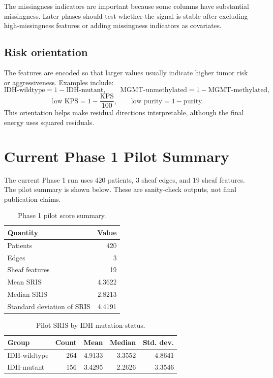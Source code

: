 \documentclass[11pt]{article}
\begin{document}
The missingness indicators are important because some columns have substantial missingness.  Later phases should test whether the signal is stable after excluding high-missingness features or adding missingness indicators as covariates.

\subsection{Risk orientation}

The features are encoded so that larger values usually indicate higher tumor risk or aggressiveness.  Examples include:
\[
\text{IDH-wildtype}=1-\text{IDH-mutant},
\qquad
\text{MGMT-unmethylated}=1-\text{MGMT-methylated},
\]
\[
\text{low KPS}=1-\frac{\text{KPS}}{100},
\qquad
\text{low purity}=1-\text{purity}.
\]
This orientation helps make residual directions interpretable, although the final energy uses squared residuals.

\section{Current Phase 1 Pilot Summary}

The current Phase 1 run uses $420$ patients, $3$ sheaf edges, and $19$ sheaf features.  The pilot summary is shown below.  These are sanity-check outputs, not final publication claims.

\begin{table}[h!]
\centering
\caption{Phase 1 pilot score summary.}
\begin{tabular}{@{}lr@{}}
\toprule
Quantity & Value\\
\midrule
Patients & 420\\
Edges & 3\\
Sheaf features & 19\\
Mean SRIS & 4.3622\\
Median SRIS & 2.8213\\
Standard deviation of SRIS & 4.4191\\
\bottomrule
\end{tabular}
\end{table}

\begin{table}[h!]
\centering
\caption{Pilot SRIS by IDH mutation status.}
\begin{tabular}{@{}lrrrr@{}}
\toprule
Group & Count & Mean & Median & Std. dev.\\
\midrule
IDH-wildtype & 264 & 4.9133 & 3.3552 & 4.8641\\
IDH-mutant & 156 & 3.4295 & 2.2626 & 3.3546\\
\bottomrule
\end{tabular}
\end{table}
\end{document}
